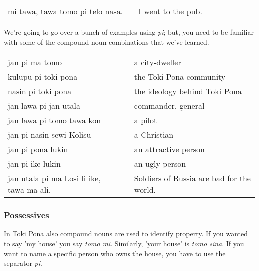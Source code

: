 \begin{supertabular}{p{5,5cm}|ll}
    mi tawa, tawa tomo pi telo nasa. &  & I went to the pub. \\
\end{supertabular}

We're going to go over a bunch of examples using \textit{pi}; but, you need to be familiar with some of the compound noun combinations that we've learned.

\begin{supertabular}{p{5,5cm}|ll}
    jan pi ma tomo                            &  & a city-dweller                            \\
    kulupu pi toki pona                       &  & the Toki Pona community                   \\
    nasin pi toki pona                        &  & the ideology behind Toki Pona             \\
    jan lawa pi jan utala                     &  & commander, general                        \\
    jan lawa pi tomo tawa kon                 &  & a pilot                                   \\
    jan pi nasin sewi Kolisu                  &  & a Christian                               \\
    jan pi pona lukin                         &  & an attractive person                      \\
    jan pi ike lukin                          &  & an ugly person                            \\
    jan utala pi ma Losi li ike, tawa ma ali. &  & Soldiers of Russia are bad for the world. \\
\end{supertabular}

%
\newpage
%
\subsubsection*{Possessives}

In Toki Pona also compound nouns are used to identify property.
If you wanted to say 'my house' you say \textit{tomo mi}.
Similarly, 'your house' is \textit{tomo sina}.
If you want to name a specific person who owns the house, you have to use the separator \textit{pi}.

